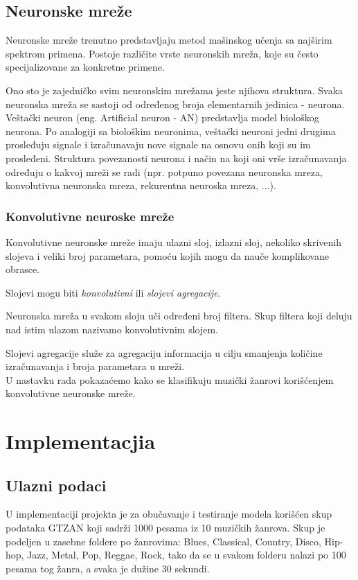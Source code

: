 \documentclass{article}
\begin{document}
\subsection{Neuronske mreže}
Neuronske mreže trenutno predstavljaju metod mašinskog učenja sa najširim spektrom primena. Postoje različite vrste neuronskih mreža, koje su često specijalizovane za konkretne primene. 

Ono sto je zajedničko svim neuronskim mrežama jeste njihova struktura. Svaka neuronska mreža se sastoji od određenog broja elementarnih jedinica - neurona. Veštački neuron (eng. Artificial neuron - AN) predstavlja model biološkog neurona. Po analogiji sa biološkim neuronima, veštački neuroni jedni drugima prosleđuju
signale i izračunavaju nove signale na osnovu onih koji su im prosleđeni. Struktura povezanosti neurona
i način na koji oni vrše izračunavanja određuju o kakvoj mreži se
radi (npr. potpuno povezana neuronska mreza, konvolutivna neuronska mreza, rekurentna neuroska mreza, ...).

\subsubsection{Konvolutivne neuroske mreže}
Konvolutivne neuronske mreže imaju ulazni sloj, izlazni sloj, nekoliko skrivenih slojeva i veliki broj parametara, pomoću kojih mogu da nauče komplikovane obrasce.

Slojevi mogu biti \emph{konvolutivni} ili \emph{slojevi agregacije}. 

Neuronska mreža u svakom sloju uči određeni broj filtera. Skup filtera koji deluju nad istim ulazom nazivamo konvolutivnim slojem.

Slojevi agregacije služe za agregaciju informacija u cilju smanjenja količine izračunavanja i broja parametara u mreži.
\\

U nastavku rada pokazaćemo kako se klasifikuju muzički žanrovi korišćenjem konvolutivne neuronske mreže.

\section{Implementacjia}

\subsection{Ulazni podaci}
U implementaciji projekta je za obučavanje i testiranje modela korišćen skup podataka GTZAN koji sadrži 1000 pesama iz 10 muzičkih žanrova. Skup je podeljen u zasebne foldere po žanrovima: Blues, Classical, Country, Disco, Hip-hop, Jazz, Metal, Pop, Reggae, Rock, tako da se u svakom folderu nalazi po 100 pesama tog žanra, a svaka je dužine 30 sekundi. 
\end{document}
